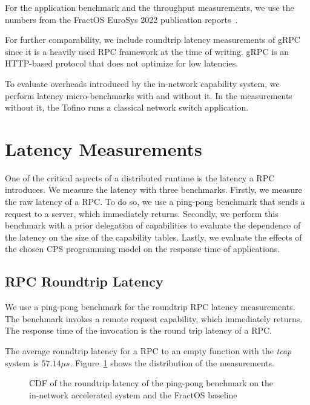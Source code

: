 For the application benchmark and the throughput measurements, we use the numbers from the FractOS EuroSys 2022 publication reports~\cite{vilanovaSlashingDisaggregationTax2022}.\@

For further comparability, we include roundtrip latency measurements of \ac{gRPC} since it is a heavily used \ac{RPC} framework at the time of writing. \ac{gRPC} is an HTTP-based protocol that does not optimize for low latencies.

To evaluate overheads introduced by the in-network capability system, we perform latency micro-benchmarks with and without it. In the measurements without it, the Tofino runs a classical network switch application.

\section{Latency Measurements}
One of the critical aspects of a distributed runtime is the latency a \ac{RPC} introduces. We measure the latency with three benchmarks. Firstly, we measure the raw latency of a \ac{RPC}. To do so, we use a ping-pong benchmark that sends a request to a server, which immediately returns. Secondly, we perform this benchmark with a prior delegation of capabilities to evaluate the dependence of the latency on the size of the capability tables. Lastly, we evaluate the effects of the chosen \ac{CPS} programming model on the response time of applications.

\subsection{RPC Roundtrip Latency}
We use a ping-pong benchmark for the roundtrip \ac{RPC} latency measurements. The benchmark invokes a remote request capability, which immediately returns. The response time of the invocation is the round trip latency of a \ac{RPC}.

The average roundtrip latency for a \ac{RPC} to an empty function with the \emph{tcap} system is $57.14 \mu s$. Figure~\ref{fig:rtt-cdf} shows the distribution of the measurements.

\begin{figure}[H]
  \centering
  
  \caption{\label{fig:rtt-cdf} \ac{CDF} of the roundtrip latency of the ping-pong benchmark on the in-network accelerated system and the FractOS baseline}
\end{figure}



